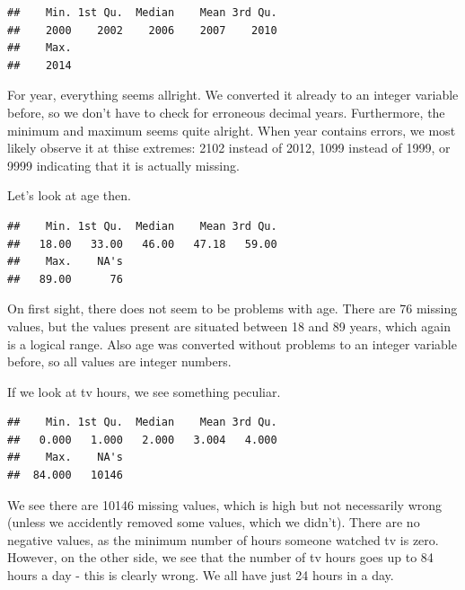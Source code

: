 \documentclass[]{tufte-book}
\newenvironment{Shaded}{}{}
\newcommand{\KeywordTok}[1]{\textcolor[rgb]{0.00,0.44,0.13}{\textbf{#1}}}
\newcommand{\OperatorTok}[1]{\textcolor[rgb]{0.40,0.40,0.40}{#1}}
\newcommand{\NormalTok}[1]{#1}
\begin{document}
\begin{verbatim}
##    Min. 1st Qu.  Median    Mean 3rd Qu. 
##    2000    2002    2006    2007    2010 
##    Max. 
##    2014
\end{verbatim}

For year, everything seems allright. We converted it already to an
integer variable before, so we don't have to check for erroneous decimal
years. Furthermore, the minimum and maximum seems quite alright. When
year contains errors, we most likely observe it at thise extremes: 2102
instead of 2012, 1099 instead of 1999, or 9999 indicating that it is
actually missing.

Let's look at age then.

\begin{Shaded}
\end{Shaded}

\begin{verbatim}
##    Min. 1st Qu.  Median    Mean 3rd Qu. 
##   18.00   33.00   46.00   47.18   59.00 
##    Max.    NA's 
##   89.00      76
\end{verbatim}

On first sight, there does not seem to be problems with age. There are
76 missing values, but the values present are situated between 18 and 89
years, which again is a logical range. Also age was converted without
problems to an integer variable before, so all values are integer
numbers.

If we look at tv hours, we see something peculiar.

\begin{Shaded}
\end{Shaded}

\begin{verbatim}
##    Min. 1st Qu.  Median    Mean 3rd Qu. 
##   0.000   1.000   2.000   3.004   4.000 
##    Max.    NA's 
##  84.000   10146
\end{verbatim}

We see there are 10146 missing values, which is high but not necessarily
wrong (unless we accidently removed some values, which we didn't). There
are no negative values, as the minimum number of hours someone watched
tv is zero. However, on the other side, we see that the number of tv
hours goes up to 84 hours a day - this is clearly wrong. We all have
just 24 hours in a day.
\end{document}
